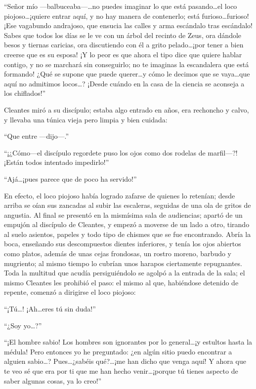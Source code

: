 \documentclass[11pt,openany]{book}
\begin{document}
“Señor mío —balbuceaba—\dots no puedes imaginar lo que está pasando\dots el loco piojoso\dots ¡quiere entrar aquí, y no hay manera de contenerlo; está furioso\dots furioso! ¡Ese vagabundo andrajoso, que ensucia las calles y arma escándalo tras escándalo! Sabes que todos los días se le ve con un árbol del recinto de Zeus, ora dándole besos y tiernas caricias, ora discutiendo con él a grito pelado\dots ¡por tener a bien creerse que es su esposa! ¡Y lo peor es que ahora el tipo dice que quiere hablar contigo, y no se marchará sin conseguirlo; no te imaginas la escandalera que está formando! ¿Qué se supone que puede querer\dots y cómo le decimos que se vaya\dots que aquí no admitimos locos\dots? ¡Desde cuándo en la casa de la ciencia se aconseja a los chiflados!” 

Cleantes miró a su discípulo; estaba algo entrado en años, era rechoncho y calvo, y llevaba una túnica vieja pero limpia y bien cuidada: 

“Que entre —dijo—.” 

“¡¿Cómo—el discípulo regordete puso los ojos como dos rodelas de marfil—?! ¡Están todos intentado impedirlo!” 

“Ajá\dots ¡pues parece que de poco ha servido!” 

En efecto, el loco piojoso había logrado zafarse de quienes lo retenían; desde arriba se oían sus zancadas al subir las escaleras, seguidas de una ola de gritos de angustia. Al final se presentó en la mismísima sala de audiencias; apartó de un empujón al discípulo de Cleantes, y empezó a moverse de un lado a otro, tirando al suelo asientos, papeles y todo tipo de chismes que se fue encontrando. Abría la boca, enseñando sus descompuestos dientes inferiores, y tenía los ojos abiertos como platos, además de unas cejas frondosas, un rostro moreno, barbudo y mugriento; al mismo tiempo lo cubrían unos harapos ciertamente repugnantes. Toda la multitud que acudía persiguiéndolo se agolpó a la entrada de la sala; el mismo Cleantes les prohibió el paso: el mismo al que, habiéndose detenido de repente, comenzó a dirigirse el loco piojoso: 

“¡Tú\dots! ¡Ah\dots eres tú sin duda!” 

“¿Soy yo\dots?” 

“¡El hombre sabio! Los hombres son ignorantes por lo general\dots ¡y estultos hasta la médula! Pero entonces yo he preguntado: ¿en algún sitio puedo encontrar a alguien sabio\dots? Pues\dots ¿sabéis qué?\dots ¡me han dicho que venga aquí! Y ahora que te veo sé que era por ti que me han hecho venir\dots ¡porque tú tienes aspecto de saber algunas cosas, ya lo creo!” 
\end{document}
